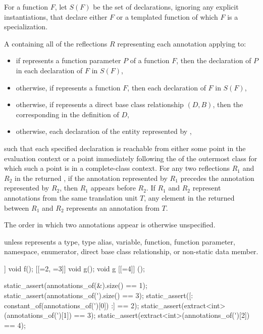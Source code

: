 \begin{itemdescr}
\pnum
For a function $F$,
let $S(F)$ be the set of declarations,
ignoring any explicit instantiations,
that declare either $F$ or
a templated function of which $F$ is a specialization.

\pnum
\returns
A  containing all of the reflections $R$
representing each annotation applying to:
\begin{itemize}
\item
  if  represents a function parameter $P$ of a function $F$,
  then the declaration of $P$ in each declaration of $F$ in $S(F)$,
\item
  otherwise, if  represents a function $F$,
  then each declaration of $F$ in $S(F)$,
\item
  otherwise, if  represents
  a direct base class relationship $(D, B)$,
  then the corresponding 
  in the definition of $D$,
\item
  otherwise, each declaration of the entity represented by ,
\end{itemize}
such that each specified declaration is reachable from either
some point in the evaluation context or
a point immediately following the 
of the outermost class for which such a point is in a complete-class context.
For any two reflections $R_1$ and $R_2$ in the returned ,
if the annotation represented by $R_1$ precedes the annotation represented by $R_2$,
then $R_1$ appears before $R_2$.
If $R_1$ and $R_2$ represent annotations from the same translation unit $T$,
any element in the returned  between $R_1$ and $R_2$
represents an annotation from $T$.
\begin{note}
The order in which two annotations appear is otherwise unspecified.
\end{note}

\pnum
\throws
{} unless
 represents a
type,
type alias,
variable,
function,
function parameter,
namespace,
enumerator,
direct base class relationship, or
non-static data member.

\pnum
\begin{example}
\begin{codeblock}
[[=1]] void f();
[[=2, =3]] void g();
void g [[=4]] ();

static_assert(annotations_of(^^f).size() == 1);
static_assert(annotations_of(^^g).size() == 3);
static_assert([: constant_of(annotations_of(^^g)[0]) :] == 2);
static_assert(extract<int>(annotations_of(^^g)[1]) == 3);
static_assert(extract<int>(annotations_of(^^g)[2]) == 4);


\end{codeblock}
\end{example}
\end{itemdescr}
